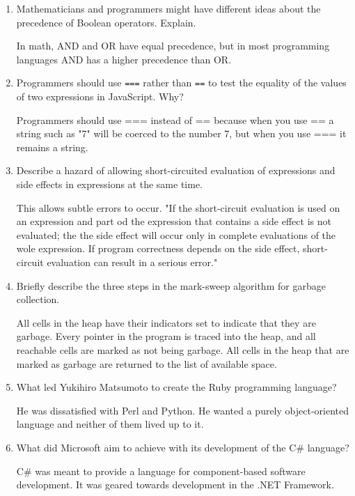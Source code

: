 \begin{enumerate}
\begin{answer}
\end{answer}
\item Mathematicians and programmers might have different ideas
about the precedence of Boolean operators. Explain.
\begin{answer}
In math, AND and OR have equal precedence, but in most programming
languages AND has a higher precedence than OR.
\end{answer}
\item Programmers should use \verb+===+ rather than \verb+==+ to
test the equality of the values of two expressions in JavaScript. Why?
\begin{answer}
Programmers should use === instead of == because when you use == a
string such as "7" will be coerced to the number 7, but when you
use === it remains a string.
\end{answer}
\item Describe a hazard of allowing short-circuited evaluation
of expressions and side effects in expressions at the same time.
\begin{answer}
This allows subtle errors to occur. "If the short-circuit
evaluation is used on an expression and part od the expression
that contains a side effect is not evaluated; the the side effect
will occur only in complete evaluations of the wole expression.
If program correctness depends on the side effect, short-circuit
evaluation can result in a serious error."
\end{answer}
\item Briefly describe the three steps in the mark-sweep algorithm
for garbage collection.
\begin{answer}
All cells in the heap have their indicators set to indicate that
they are garbage. Every pointer in the program is traced into the
heap, and all reachable cells are marked as not being garbage.
All cells in the heap that are marked as garbage are returned to
the list of available space.
\end{answer}
\item What led Yukihiro Matsumoto to create the Ruby programming language?
\begin{answer}
He was dissatisfied with Perl and Python. He wanted a purely
object-oriented language and neither of them lived up to it.
\end{answer}
\item What did Microsoft aim to achieve with its development of the
C\# language?
\begin{answer}
C\# was meant to provide a language for component-based software
development. It was geared towards development in the .NET
Framework.
\end{answer}
\end{enumerate}
